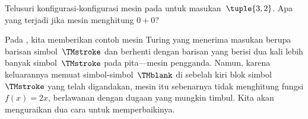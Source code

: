 \documentclass[../../../include/open-logic-section]{subfiles}
\begin{document}
\begin{prob}
Telusuri konfigurasi-konfigurasi mesin pada
 untuk masukan~$\tuple{3,2}$. Apa yang terjadi
jika mesin menghitung $0+0$?
\end{prob}

\begin{explain}
Pada , kita memberikan contoh mesin Turing yang
menerima masukan berupa barisan simbol~$\TMstroke$ dan berhenti dengan barisan
yang berisi dua kali lebih banyak simbol~$\TMstroke$ pada pita---mesin
pengganda. Namun, karena keluarannya memuat simbol-simbol~$\TMblank$ di sebelah
kiri blok simbol~$\TMstroke$ yang telah digandakan, mesin itu sebenarnya tidak
menghitung fungsi $f(x) = 2x$, berlawanan dengan dugaan yang mungkin timbul.
Kita akan menguraikan dua cara untuk memperbaikinya.
\end{explain}
\end{document}
